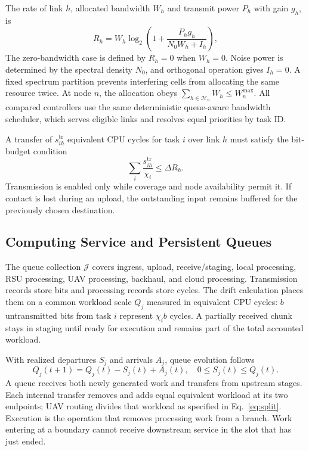 \documentclass[journal]{IEEEtran}
\begin{document}
The rate of link $h$, allocated bandwidth $W_h$ and transmit power $P_h$ with gain $g_h$, is
\begin{equation}
R_h=W_h\log_2\!\left(1+\frac{P_hg_h}{N_0W_h+I_h}\right),
\label{eq:rate}
\end{equation}
The zero-bandwidth case is defined by $R_h=0$ when $W_h=0$. Noise power is determined by the spectral density $N_0$, and orthogonal operation gives $I_h=0$. A fixed spectrum partition prevents interfering cells from allocating the same resource twice. At node $n$, the allocation obeys $\sum_{h\in\mathcal H_n}W_h\le W_n^{\max}$. All compared controllers use the same deterministic queue-aware bandwidth scheduler, which serves eligible links and resolves equal priorities by task ID.

A transfer of $s_{ih}^{\mathrm{tr}}$ equivalent CPU cycles for task $i$ over link $h$ must satisfy the bit-budget condition
\begin{equation}
\sum_i\frac{s_{ih}^{\mathrm{tr}}}{\chi_i}\le\Delta R_h.
\label{eq:radio_capacity}
\end{equation}
Transmission is enabled only while coverage and node availability permit it. If contact is lost during an upload, the outstanding input remains buffered for the previously chosen destination.

\subsection{Computing Service and Persistent Queues}
The queue collection $\mathcal J$ covers ingress, upload, receive/staging, local processing, RSU processing, UAV processing, backhaul, and cloud processing. Transmission records store bits and processing records store cycles. The drift calculation places them on a common workload scale $Q_j$ measured in equivalent CPU cycles: $b$ untransmitted bits from task $i$ represent $\chi_i b$ cycles. A partially received chunk stays in staging until ready for execution and remains part of the total accounted workload.

With realized departures $S_j$ and arrivals $A_j$, queue evolution follows
\begin{equation}
Q_j(t+1)=Q_j(t)-S_j(t)+A_j(t),\quad
0\le S_j(t)\le Q_j(t).
\label{eq:queue}
\end{equation}
A queue receives both newly generated work and transfers from upstream stages. Each internal transfer removes and adds equal equivalent workload at its two endpoints; UAV routing divides that workload as specified in Eq.~\eqref{eq:split}. Execution is the operation that removes processing work from a branch. Work entering at a boundary cannot receive downstream service in the slot that has just ended.
\end{document}
